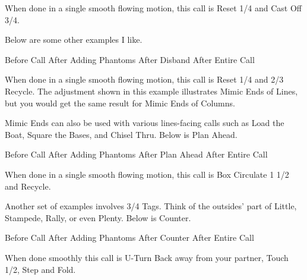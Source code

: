 \documentclass[12pt]{article}
\begin{document}
When done in a single smooth flowing motion, this call is
Reset 1/4 and Cast Off 3/4.

Below are some other examples I like.

\displayfour
{\cr
 }
{Before Call}
{\cr
 }
{After Adding Phantoms}
{\cr
 \cr
 \cr
 }
{After Disband}
{\cr
 }
{After Entire Call}
\endexample

When done in a single smooth flowing motion, this call is
Reset 1/4 and 2/3 Recycle.
The adjustment shown in this example illustrates Mimic Ends of Lines,
but you would get the same result for Mimic Ends of Columns.

Mimic Ends can also be used with various lines-facing calls such as
Load the Boat, Square the Bases, and Chisel Thru.  Below is Plan Ahead.

\displayfour
{\cr
 }
{Before Call}
{\cr
 }
{After Adding Phantoms}
{\cr
 }
{After Plan Ahead}
{\cr
 }
{After Entire Call}
\endexample

When done in a single smooth flowing motion, this call is
Box Circulate 1 1/2 and Recycle.

Another set of examples involves 3/4 Tags.  Think of the outsides'
part of Little, Stampede, Rally, or even Plenty.  Below is Counter.

\displayfour
{\cr
 }
{Before Call}
{\idancer{}\idancer\cr
 \cr
 \idancer{}\idancer}
{After Adding Phantoms}
{\cr
 }
{After Counter}
{\cr
 }
{After Entire Call}
\endexample

When done smoothly this call is U-Turn Back away from your partner,
Touch 1/2, Step and Fold.
\end{document}

